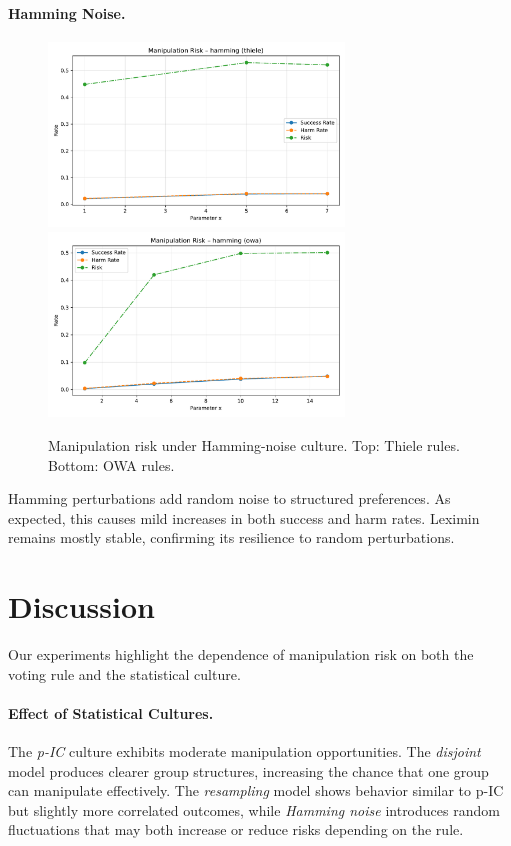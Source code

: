 \documentclass[11pt]{article}
\begin{document}
\paragraph{Hamming Noise.}
\begin{figure}[h!]
\centering
\includegraphics[width=0.7\textwidth]{figures/risk_hamming_thiele.pdf}
\includegraphics[width=0.7\textwidth]{figures/risk_hamming_owa.pdf}
\caption{Manipulation risk under Hamming-noise culture. Top: Thiele rules. Bottom: OWA rules.}
\end{figure}
Hamming perturbations add random noise to structured preferences. As expected,
this causes mild increases in both success and harm rates. Leximin remains
mostly stable, confirming its resilience to random perturbations.

\section{Discussion}
Our experiments highlight the dependence of manipulation risk on both the
voting rule and the statistical culture.

\paragraph{Effect of Statistical Cultures.}
The \emph{p-IC} culture exhibits moderate manipulation opportunities.
The \emph{disjoint} model produces clearer group structures, increasing the
chance that one group can manipulate effectively. The \emph{resampling} model
shows behavior similar to p-IC but slightly more correlated outcomes, while
\emph{Hamming noise} introduces random fluctuations that may both increase or
reduce risks depending on the rule.
\end{document}
